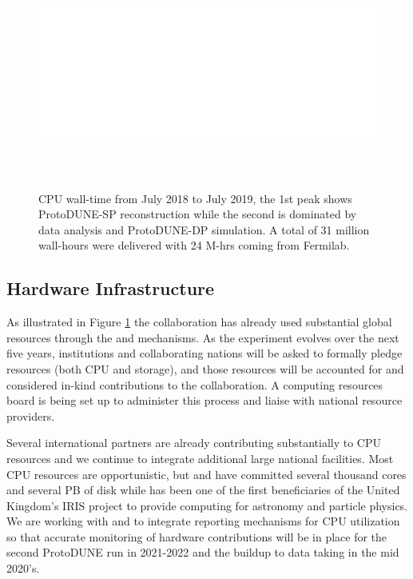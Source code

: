 
\begin{figure}[htp]
\centering
\includegraphics[height=3in]{graphics/comp-ComputingLastYear.png}

\caption{CPU wall-time from July 2018 to July 2019, the 1st peak shows  ProtoDUNE-SP reconstruction while the second is dominated by data analysis and ProtoDUNE-DP simulation. A total of 31 million wall-hours were delivered with 24 M-hrs coming from Fermilab.  }
\label{fig:ch-exec-comp-cpupie}
\end{figure}


\subsection{Hardware Infrastructure}
As illustrated in Figure \ref{fig:ch-exec-comp-cpupie} the  collaboration has already used substantial global resources through the  and  mechanisms. As the experiment evolves over the next five years, institutions and collaborating nations will be asked to formally pledge resources (both CPU and storage), and those resources will be accounted for and considered in-kind contributions to the collaboration.  A   computing resources board  is being set up to administer this process and liaise with national resource providers. 

Several international partners are already contributing substantially to CPU resources and we continue to  integrate additional large national facilities. Most CPU resources are opportunistic, but  and  have committed several thousand cores and several PB of disk while  has been one of the first beneficiaries of the United Kingdom's IRIS project to provide computing for astronomy and particle physics.  
We are working with  and  to integrate reporting mechanisms for CPU utilization so that accurate monitoring of hardware contributions will be in place for the second ProtoDUNE run in 2021-2022 and the buildup to data taking in the mid 2020's. 


